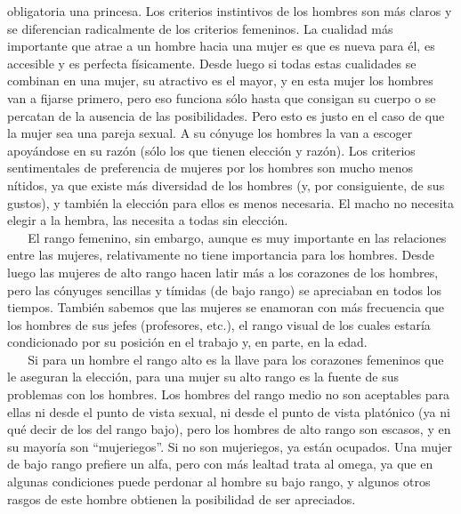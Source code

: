 obligatoria una princesa. Los criterios instintivos de los hombres son
más claros y se diferencian radicalmente de los criterios femeninos. La
cualidad más importante que atrae a un hombre hacia una mujer es que es
nueva para él, es accesible y es perfecta físicamente. Desde luego si
todas estas cualidades se combinan en una mujer, su atractivo es el
mayor, y en esta mujer los hombres van a fijarse primero, pero eso
funciona sólo hasta que consigan su cuerpo o se percatan de la ausencia
de las posibilidades. Pero esto es justo en el caso de que la mujer sea
una pareja sexual. A su cónyuge los hombres la van a escoger apoyándose
en su razón (sólo los que tienen elección y razón). Los criterios
sentimentales de preferencia de mujeres por los hombres son mucho menos
nítidos, ya que existe más diversidad de los hombres (y, por
consiguiente, de sus gustos), y también la elección para ellos es menos
necesaria. El macho no necesita elegir a la hembra, las necesita a todas
sin elección.\\
\hspace*{0.333em} ~ ~ El rango femenino, sin embargo, aunque es muy
importante en las relaciones entre las mujeres, relativamente no tiene
importancia para los hombres. Desde luego las mujeres de alto rango
hacen latir más a los corazones de los hombres, pero las cónyuges
sencillas y tímidas (de bajo rango) se apreciaban en todos los tiempos.
También sabemos que las mujeres se enamoran con más frecuencia que los
hombres de sus jefes (profesores, etc.), el rango visual de los cuales
estaría condicionado por su posición en el trabajo y, en parte, en la
edad.\\
\hspace*{0.333em} ~ ~ Si para un hombre el rango alto es la llave para
los corazones femeninos que le aseguran la elección, para una mujer su
alto rango es la fuente de sus problemas con los hombres. Los hombres
del rango medio no son aceptables para ellas ni desde el punto de vista
sexual, ni desde el punto de vista platónico (ya ni qué decir de los del
rango bajo), pero los hombres de alto rango son escasos, y en su mayoría
son ``mujeriegos''. Si no son mujeriegos, ya están ocupados. Una mujer
de bajo rango prefiere un alfa, pero con más lealtad trata al omega, ya
que en algunas condiciones puede perdonar al hombre su bajo rango, y
algunos otros rasgos de este hombre obtienen la posibilidad de ser
apreciados.

